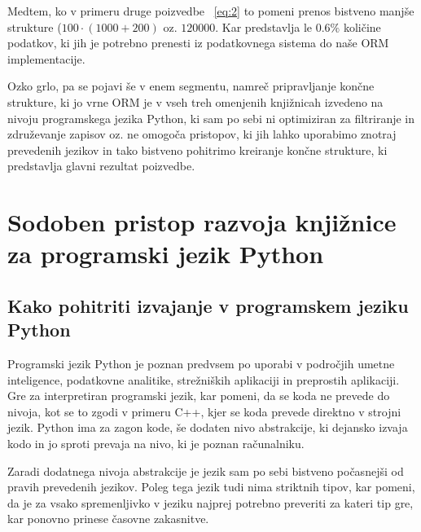 \documentclass[a4paper,12pt,openright]{book}
\begin{document}
    Medtem, ko v primeru druge poizvedbe ~\eqref{eq:2} to pomeni prenos bistveno manjše strukture ($100 \cdot (1000 + 200)$ oz. $\num{120000}$. Kar predstavlja le $0.6\%$ količine podatkov, ki jih je potrebno prenesti iz podatkovnega sistema do naše ORM implementacije.

    Ozko grlo, pa se pojavi še v enem segmentu, namreč pripravljanje končne strukture, ki jo vrne ORM je v vseh treh omenjenih knjižnicah izvedeno na nivoju programskega jezika Python, ki sam po sebi ni optimiziran za filtriranje in združevanje zapisov oz. ne omogoča pristopov, ki jih lahko uporabimo znotraj prevedenih jezikov in tako bistveno pohitrimo kreiranje končne strukture, ki predstavlja glavni rezultat poizvedbe.

\chapter{Sodoben pristop razvoja knjižnice za programski jezik Python}
\label{ch1}

    \section{Kako pohitriti izvajanje v programskem jeziku Python}
   Programski jezik Python je poznan predvsem po uporabi v področjih umetne inteligence, podatkovne analitike, strežniških aplikaciji in preprostih aplikaciji. Gre za interpretiran programski jezik, kar pomeni, da se koda ne prevede do nivoja, kot se to zgodi v primeru C++, kjer se koda prevede direktno v strojni jezik. Python ima za zagon kode, še dodaten nivo abstrakcije, ki dejansko izvaja kodo in jo sproti prevaja na nivo, ki je poznan računalniku.

   Zaradi dodatnega nivoja abstrakcije je jezik sam po sebi bistveno počasnejši od pravih prevedenih jezikov. Poleg tega jezik tudi nima striktnih tipov, kar pomeni, da je za vsako spremenljivko v jeziku najprej potrebno preveriti za kateri tip gre, kar ponovno prinese časovne zakasnitve.
\end{document}
